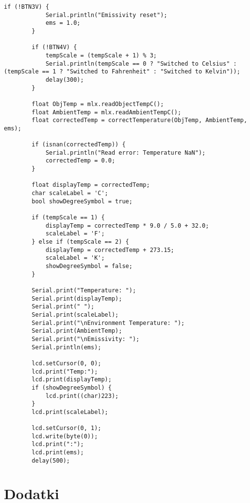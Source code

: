 \begin{lstlisting}[style=mystyle]
        if (!BTN3V) {
            Serial.println("Emissivity reset");
            ems = 1.0;
        }
    
        if (!BTN4V) {
            tempScale = (tempScale + 1) % 3;
            Serial.println(tempScale == 0 ? "Switched to Celsius" : (tempScale == 1 ? "Switched to Fahrenheit" : "Switched to Kelvin"));
            delay(300);
        }
    
        float ObjTemp = mlx.readObjectTempC();
        float AmbientTemp = mlx.readAmbientTempC();
        float correctedTemp = correctTemperature(ObjTemp, AmbientTemp, ems);
    
        if (isnan(correctedTemp)) {
            Serial.println("Read error: Temperature NaN");
            correctedTemp = 0.0;
        }
    
        float displayTemp = correctedTemp;
        char scaleLabel = 'C';
        bool showDegreeSymbol = true;
    
        if (tempScale == 1) {
            displayTemp = correctedTemp * 9.0 / 5.0 + 32.0;
            scaleLabel = 'F';
        } else if (tempScale == 2) {
            displayTemp = correctedTemp + 273.15;
            scaleLabel = 'K';
            showDegreeSymbol = false;
        }
    
        Serial.print("Temperature: ");
        Serial.print(displayTemp);
        Serial.print(" ");
        Serial.print(scaleLabel);
        Serial.print("\nEnvironment Temperature: ");
        Serial.print(AmbientTemp);
        Serial.print("\nEmissivity: ");
        Serial.println(ems);
    
        lcd.setCursor(0, 0);
        lcd.print("Temp:");
        lcd.print(displayTemp);
        if (showDegreeSymbol) {
            lcd.print((char)223);
        }
        lcd.print(scaleLabel);
    
        lcd.setCursor(0, 1);
        lcd.write(byte(0));
        lcd.print(":");
        lcd.print(ems);
        delay(500);
    \end{lstlisting}

    \chapter{Dodatki}
    